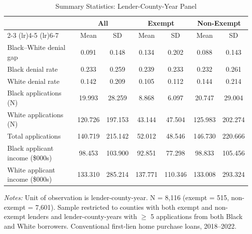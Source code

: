 \begin{table}[H]
\centering
\caption{Summary Statistics: Lender-County-Year Panel}
\label{tab:summary}
\begin{threeparttable}
\small
\begin{tabular}{lcccccc}
\toprule
& \multicolumn{2}{c}{All} & \multicolumn{2}{c}{Exempt} & \multicolumn{2}{c}{Non-Exempt} \\
\cmidrule(lr){2-3} \cmidrule(lr){4-5} \cmidrule(lr){6-7}
& Mean & SD & Mean & SD & Mean & SD \\
\midrule
Black--White denial gap & 0.091 & 0.148 & 0.134 & 0.202 & 0.088 & 0.143 \\
Black denial rate & 0.233 & 0.259 & 0.239 & 0.233 & 0.232 & 0.261 \\
White denial rate & 0.142 & 0.209 & 0.105 & 0.112 & 0.144 & 0.214 \\
Black applications (N) & 19.993 & 28.259 & 8.868 & 6.097 & 20.747 & 29.004 \\
White applications (N) & 120.726 & 197.153 & 43.144 & 47.504 & 125.983 & 202.274 \\
Total applications & 140.719 & 215.142 & 52.012 & 48.546 & 146.730 & 220.666 \\
Black applicant income (\$000s) & 98.453 & 103.900 & 92.851 & 77.298 & 98.833 & 105.456 \\
White applicant income (\$000s) & 133.310 & 285.214 & 137.771 & 110.346 & 133.008 & 293.324 \\
\bottomrule
\end{tabular}
\begin{tablenotes}[flushleft]\small
\item \textit{Notes:} Unit of observation is lender-county-year. N = 8,116 (exempt = 515, non-exempt = 7,601). Sample restricted to counties with both exempt and non-exempt lenders and lender-county-years with $\geq$ 5 applications from both Black and White borrowers. Conventional first-lien home purchase loans, 2018--2022.
\end{tablenotes}
\end{threeparttable}
\end{table}
